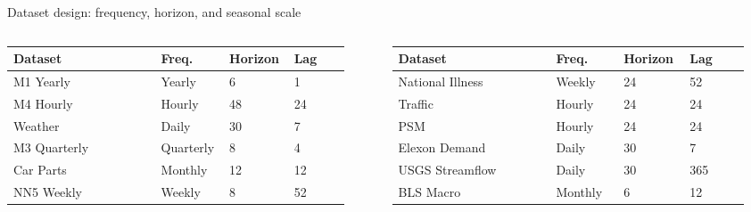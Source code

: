 \documentclass[aspectratio=169,10pt]{beamer}
\begin{document}
\begin{frame}{Dataset design: frequency, horizon, and seasonal scale}
  \vspace{-0.02cm}
  \scriptsize
  \renewcommand{\arraystretch}{1.20}
  \setlength{\tabcolsep}{3pt}
  \begin{columns}[T,totalwidth=0.97\linewidth]
    \begin{column}{0.48\linewidth}
      \begin{tabular}{L{0.42\linewidth} C{0.18\linewidth} C{0.16\linewidth} C{0.16\linewidth}}
        \toprule
        \textbf{Dataset} & \textbf{Freq.} & \textbf{Horizon} & \textbf{Lag} \\
        \midrule
        M1 Yearly & Yearly & 6 & 1 \\
        M4 Hourly & Hourly & 48 & 24 \\
        Weather & Daily & 30 & 7 \\
        M3 Quarterly & Quarterly & 8 & 4 \\
        Car Parts & Monthly & 12 & 12 \\
        NN5 Weekly & Weekly & 8 & 52 \\
        \bottomrule
      \end{tabular}
    \end{column}
    \begin{column}{0.48\linewidth}
      \begin{tabular}{L{0.42\linewidth} C{0.18\linewidth} C{0.16\linewidth} C{0.16\linewidth}}
        \toprule
        \textbf{Dataset} & \textbf{Freq.} & \textbf{Horizon} & \textbf{Lag} \\
        \midrule
        National Illness & Weekly & 24 & 52 \\
        Traffic & Hourly & 24 & 24 \\
        PSM & Hourly & 24 & 24 \\
        Elexon Demand & Daily & 30 & 7 \\
        USGS Streamflow & Daily & 30 & 365 \\
        BLS Macro & Monthly & 6 & 12 \\
        \bottomrule
      \end{tabular}
    \end{column}
  \end{columns}


\end{frame}
\end{document}
